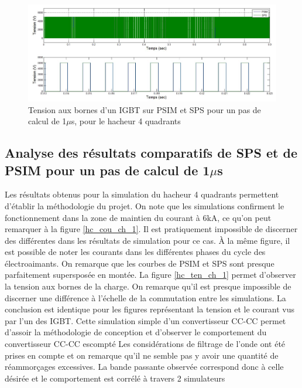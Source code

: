 \begin{figure}[htb]
\centering
\includegraphics[scale=0.5]{fig/Hacheur4Quadrants/HacheurTensionIGBT1u.jpg}
\caption{Tension aux bornes d'un IGBT sur PSIM et SPS pour un pas de calcul de 1$\mu$s, pour le hacheur 4 quadrants}
\label{hc_IG_ten_1}
\end{figure}


\clearpage
\subsection{Analyse des résultats comparatifs de SPS et de PSIM pour un pas de calcul de 1$\mu$s}

Les résultats obtenus pour la simulation du hacheur 4 quadrants permettent d'établir la méthodologie du projet. On note que les simulations confirment le fonctionnement dans la zone de maintien du courant à 6kA, ce qu'on peut remarquer à la figure \ref{hc_cou_ch_1}. Il est pratiquement impossible de discerner des différentes dans les résultats de simulation pour ce cas. À la même figure, il est possible de noter les courants dans les différentes phases du cycle des électroaimants. On remarque que les courbes de PSIM et SPS sont presque parfaitement supersposée en montée. La figure \ref{hc_ten_ch_1} permet d'observer la tension aux bornes de la charge. On remarque qu'il est presque impossible de discerner une différence à l'échelle de la commutation entre les simulations. La conclusion est identique pour les figures représentant la tension et le courant vus par l'un des IGBT. Cette simulation simple d'un convertisseur CC-CC permet d'assoir la méthodologie de conception et d'observer le comportement du convertisseur CC-CC escompté Les considérations de filtrage de l'onde ont été prises en compte et on remarque qu'il ne semble pas y avoir une quantité de réammorçages excessives. La bande passante observée correspond donc à celle désirée et le comportement est corrélé à travers 2 simulateurs




